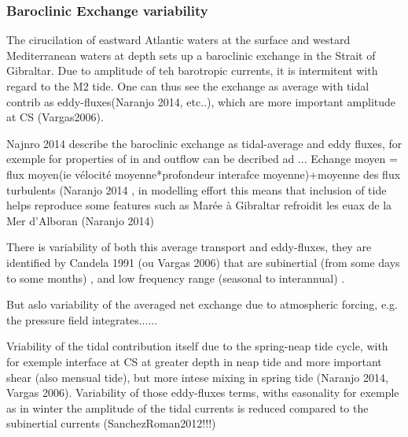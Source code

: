 


\subsubsection{Baroclinic Exchange variability}

The cirucilation of eastward Atlantic waters at the surface and westard Mediterranean waters at depth sets up a baroclinic exchange in the Strait of Gibraltar. Due to amplitude of teh barotropic currents, it is intermitent with regard to the M2 tide. One can thus see the exchange as average with tidal contrib as eddy-fluxes(Naranjo 2014, etc..), which are more important amplitude at CS (Vargas2006).  

Najnro 2014 describe the baroclinic exchange as tidal-average and eddy fluxes, for exemple for properties of in and outflow can be decribed ad ... 
Echange moyen = flux moyen(ie vélocité moyenne*profondeur interafce moyenne)+moyenne des flux turbulents (Naranjo 2014  , in modelling effort this means that inclusion of tide helps reproduce some features such as Marée à Gibraltar refroidit les euax de la Mer d’Alboran (Naranjo 2014)

There is variability of both this average transport and eddy-fluxes, they are identified by Candela 1991 (ou Vargas 2006) that are subinertial (from some days to some months) , and low frequency range (seasonal to interannual) .

But aslo variability of the averaged net exchange due to atmospheric forcing, e.g. the pressure field integrates......

Vriability of the tidal contribution itself due to the spring-neap tide cycle, with for exemple interface at CS at greater depth in neap tide and more important shear (also mensual tide), but more intese mixing in spring tide (Naranjo 2014, Vargas 2006). Variability of those eddy-fluxes terms, withs easonality for exemple as in winter the amplitude of the tidal currents is reduced compared to the subinertial currents (SanchezRoman2012!!!)






